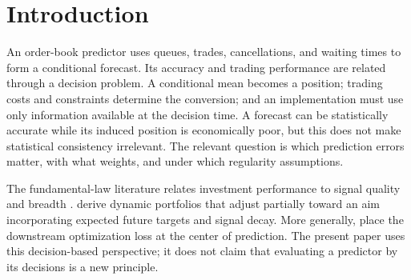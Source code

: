 \documentclass[11pt]{article}
\theoremstyle{plain}
\theoremstyle{definition}
\theoremstyle{remark}
\begin{document}
\section{Introduction}

An order-book predictor uses queues, trades, cancellations, and waiting
times to form a conditional forecast. Its accuracy and trading performance
are related through a decision problem. A conditional mean becomes a position;
trading costs and constraints determine the conversion; and an
implementation must use only information available at the decision time.
A forecast can be statistically accurate while its induced position is
economically poor, but this does not make statistical consistency
irrelevant. The relevant question is which prediction errors matter,
with what weights, and under which regularity assumptions.

The fundamental-law literature relates investment performance to signal
quality and breadth \citep{Grinold1989,GrinoldKahn2000}.
\citet{GarleanuPedersen2013} derive dynamic portfolios that adjust
partially toward an aim incorporating expected future targets and signal
decay. More generally, \citet{ElmachtoubGrigas2022} place the downstream
optimization loss at the center of prediction. The present paper uses
this decision-based perspective; it does not claim that evaluating a
predictor by its decisions is a new principle.
\end{document}
